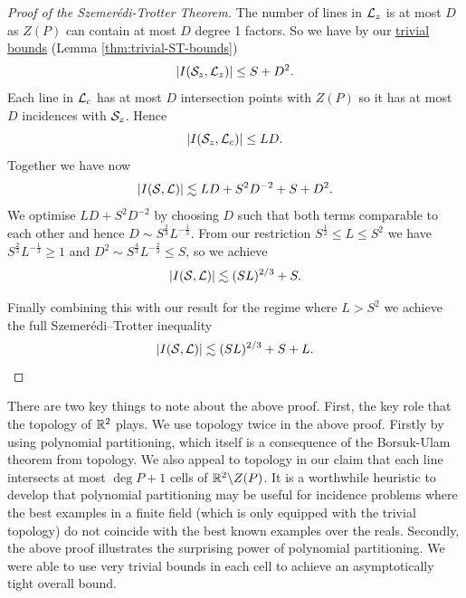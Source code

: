 \begin{proof}[Proof of the Szemerédi-Trotter Theorem]
The number of lines in $\mathcal L_z$ is at most $D$ as $Z(P)$ can contain at most $D$ degree 1 factors. So we have by our \hyperref[thm:trivial-ST-bounds]{trivial bounds} (Lemma \ref{thm:trivial-ST-bounds})
$$|I(\mathcal S_z, \mathcal L_z)| \leq S + D^2.$$
Each line in $\mathcal L_c$ has at most $D$ intersection points with $Z(P)$ so it has at most $D$ incidences with $\mathcal S_z$. Hence
 $$|I(\mathcal S_z, \mathcal L_c)| \leq LD.$$
Together we have now 
$$|I(\mathcal S, \mathcal L)| \lesssim LD + S^2D^{-2} +S + D^2.$$
We optimise $LD + S^2D^{-2}$ by choosing $D$ such that both terms comparable to each other and hence $D \sim S^{\frac{2}{3}} L^{-\frac{1}{3}}$. 
From our restriction $S^{\frac{1}{2}} \leq L \leq S^2$ we have $S^{\frac{2}{3}} L^{-\frac{1}{3}} \geq 1$
and $D^2 \sim S^{\frac{4}{3}} L^{-\frac{2}{3}} \leq S$, so we achieve
$$|I(\mathcal S, \mathcal L)| \lesssim (SL)^{2/3} + S. $$

Finally combining this with our result for the regime where $L>S^2$ we achieve the full Szemerédi–Trotter inequality 
\[
|I(\mathcal S,\mathcal L)| \lesssim (SL)^{2/3} + S + L.
\]
\end{proof}

There are two key things to note about the above proof. First, the key role that the topology of $\mathbb R^2$ plays. We use topology twice in the above proof. Firstly by using polynomial partitioning, which itself is a consequence of the Borsuk-Ulam theorem from topology. We also appeal to topology in our claim that each line intersects at most $\deg P +1$ cells of $\mathbb R^2 \backslash Z(P)$.  It is a worthwhile heuristic to develop that polynomial partitioning may be useful for incidence problems
where the best examples in a finite field (which is only equipped with the trivial topology) do not coincide with the best known examples over the reals.
Secondly, the above proof illustrates the surprising power of polynomial partitioning. We were able to use very trivial bounds in each cell to achieve
an asymptotically tight overall bound. 

